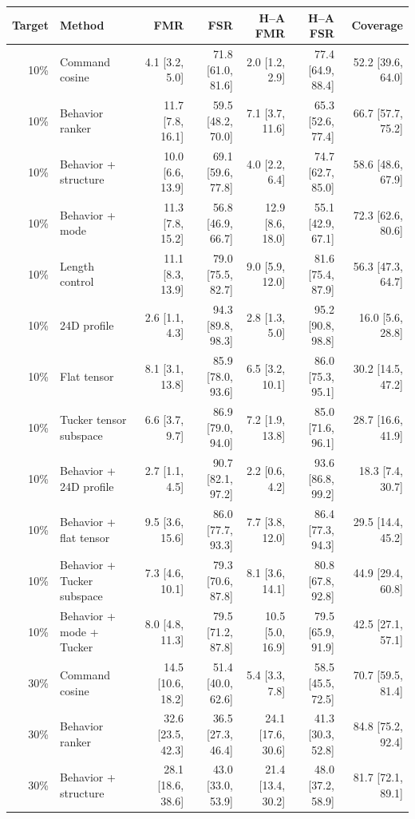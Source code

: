 \begin{table}[p]
\centering
\scriptsize
\setlength{\tabcolsep}{3pt}
\begin{tabular}{rlrrrrr}
\toprule
Target & Method & FMR & FSR & H--A FMR & H--A FSR & Coverage \\
\midrule
10\% & Command cosine & 4.1 [3.2, 5.0] & 71.8 [61.0, 81.6] & 2.0 [1.2, 2.9] & 77.4 [64.9, 88.4] & 52.2 [39.6, 64.0] \\
10\% & Behavior ranker & 11.7 [7.8, 16.1] & 59.5 [48.2, 70.0] & 7.1 [3.7, 11.6] & 65.3 [52.6, 77.4] & 66.7 [57.7, 75.2] \\
10\% & Behavior + structure & 10.0 [6.6, 13.9] & 69.1 [59.6, 77.8] & 4.0 [2.2, 6.4] & 74.7 [62.7, 85.0] & 58.6 [48.6, 67.9] \\
10\% & Behavior + mode & 11.3 [7.8, 15.2] & 56.8 [46.9, 66.7] & 12.9 [8.6, 18.0] & 55.1 [42.9, 67.1] & 72.3 [62.6, 80.6] \\
10\% & Length control & 11.1 [8.3, 13.9] & 79.0 [75.5, 82.7] & 9.0 [5.9, 12.0] & 81.6 [75.4, 87.9] & 56.3 [47.3, 64.7] \\
10\% & 24D profile & 2.6 [1.1, 4.3] & 94.3 [89.8, 98.3] & 2.8 [1.3, 5.0] & 95.2 [90.8, 98.8] & 16.0 [5.6, 28.8] \\
10\% & Flat tensor & 8.1 [3.1, 13.8] & 85.9 [78.0, 93.6] & 6.5 [3.2, 10.1] & 86.0 [75.3, 95.1] & 30.2 [14.5, 47.2] \\
10\% & Tucker tensor subspace & 6.6 [3.7, 9.7] & 86.9 [79.0, 94.0] & 7.2 [1.9, 13.8] & 85.0 [71.6, 96.1] & 28.7 [16.6, 41.9] \\
10\% & Behavior + 24D profile & 2.7 [1.1, 4.5] & 90.7 [82.1, 97.2] & 2.2 [0.6, 4.2] & 93.6 [86.8, 99.2] & 18.3 [7.4, 30.7] \\
10\% & Behavior + flat tensor & 9.5 [3.6, 15.6] & 86.0 [77.7, 93.3] & 7.7 [3.8, 12.0] & 86.4 [77.3, 94.3] & 29.5 [14.4, 45.2] \\
10\% & Behavior + Tucker subspace & 7.3 [4.6, 10.1] & 79.3 [70.6, 87.8] & 8.1 [3.6, 14.1] & 80.8 [67.8, 92.8] & 44.9 [29.4, 60.8] \\
10\% & Behavior + mode + Tucker & 8.0 [4.8, 11.3] & 79.5 [71.2, 87.8] & 10.5 [5.0, 16.9] & 79.5 [65.9, 91.9] & 42.5 [27.1, 57.1] \\
30\% & Command cosine & 14.5 [10.6, 18.2] & 51.4 [40.0, 62.6] & 5.4 [3.3, 7.8] & 58.5 [45.5, 72.5] & 70.7 [59.5, 81.4] \\
30\% & Behavior ranker & 32.6 [23.5, 42.3] & 36.5 [27.3, 46.4] & 24.1 [17.6, 30.6] & 41.3 [30.3, 52.8] & 84.8 [75.2, 92.4] \\
30\% & Behavior + structure & 28.1 [18.6, 38.6] & 43.0 [33.0, 53.9] & 21.4 [13.4, 30.2] & 48.0 [37.2, 58.9] & 81.7 [72.1, 89.1] \\

\end{tabular}
\end{table}
